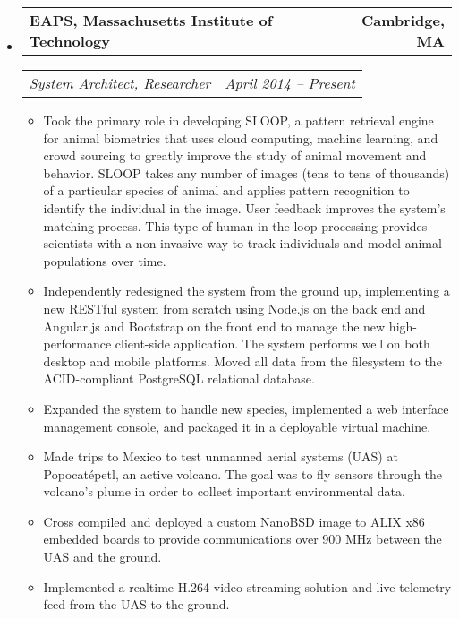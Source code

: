 \documentclass[10pt,letterpaper]{article}
\makeatletter
\newcommand{\headerrow}[2]
{\begin{tabular*}{\linewidth}{l@{\extracolsep{\fill}}r}
	#1 &
	#2 \\
\end{tabular*}}
\makeatother
\begin{document}
\begin{itemize}
	\parskip=0.1em
    \item
    \headerrow
        {\textbf{EAPS, Massachusetts Institute of Technology}}
        {\textbf{Cambridge, MA}}
    \headerrow
        {\emph{System Architect, Researcher}}
        {\emph{April 2014 -- Present}}
    \begin{itemize}
        \item Took the primary role in developing SLOOP, a pattern retrieval engine for animal biometrics that uses cloud computing, machine learning, and crowd sourcing to greatly improve the study of animal movement and behavior.  SLOOP takes any number of images (tens to tens of thousands) of a particular species of animal and applies pattern recognition to identify the individual in the image.  User feedback improves the system's matching process.  This type of human-in-the-loop processing provides scientists with a non-invasive way to track individuals and model animal populations over time.
        \item Independently redesigned the system from the ground up, implementing a new RESTful system from scratch using Node.js on the back end and Angular.js and Bootstrap on the front end to manage the new high-performance client-side application.  The system performs well on both desktop and mobile platforms.  Moved all data from the filesystem to the ACID-compliant PostgreSQL relational database.
        \item Expanded the system to handle new species, implemented a web interface management console, and packaged it in a deployable virtual machine.
        \item Made trips to Mexico to test unmanned aerial systems (UAS) at Popocatépetl, an active volcano. The goal was to fly sensors through the volcano's plume in order to collect important environmental data.
        \item Cross compiled and deployed a custom NanoBSD image to ALIX x86 embedded boards to provide communications over 900 MHz between the UAS and the ground.
        \item Implemented a realtime H.264 video streaming solution and live telemetry feed from the UAS to the ground.
    \end{itemize}


\end{itemize}
\end{document}
